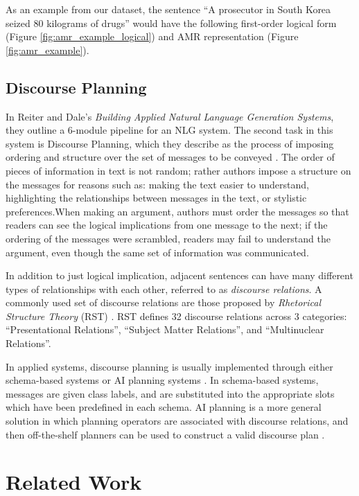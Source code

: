 \documentclass[12pt]{article}
\begin{document}
As an example from our dataset, the sentence ``A prosecutor in South Korea seized 80
kilograms of drugs'' would have the following first-order logical form (Figure \ref{fig:amr_example_logical}) and AMR
representation (Figure \ref{fig:amr_example}).

\subsection{Discourse Planning}

In Reiter and Dale's {\em Building Applied Natural Language Generation Systems}, they outline a 6-module pipeline for an NLG system. The second task in this system is Discourse Planning, which they describe as the process of imposing ordering and structure over the set of messages to be conveyed \cite{applied_nlg}. The order of pieces of information in text is not random; rather authors impose a structure on the messages for reasons such as: making the text easier to understand, highlighting the relationships between messages in the text, or stylistic preferences.When making an argument, authors must order the messages so that readers can see the logical implications from one message to the next; if the ordering of the messages were scrambled, readers may fail to understand the argument, even though the same set of information was communicated.

In addition to just logical implication, adjacent sentences can have many different types of relationships with each other, referred to as {\em discourse relations}. A commonly used set of discourse relations are those proposed by {\em Rhetorical Structure Theory} (RST) \cite{rst}. RST defines 32 discourse relations across 3 categories: ``Presentational Relations'', ``Subject Matter Relations'', and ``Multinuclear Relations''.

In applied systems, discourse planning is usually implemented through either schema-based systems or AI planning systems \cite{applied_nlg}. In schema-based systems, messages are given class labels, and are substituted into the appropriate slots which have been predefined in each schema. AI planning is a more general solution in which planning operators are associated with discourse relations, and then off-the-shelf planners can be used to construct a valid discourse plan \cite{hovy1993automated}\cite{paris1990natural}.

\section{Related Work}
\end{document}
